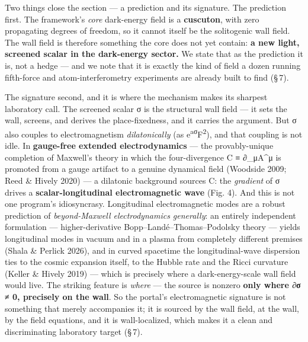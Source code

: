 \documentclass[11pt]{article}
\begin{document}
Two things close the section --- a prediction and its signature. The prediction first. The framework's \emph{core} dark-energy field is a \textbf{cuscuton}, with zero propagating degrees of freedom, so it cannot itself be the solitogenic wall field. The wall field is therefore something the core does not yet contain: \textbf{a new light, screened scalar in the dark-energy sector.} We state that as the prediction it is, not a hedge --- and we note that it is exactly the kind of field a dozen running fifth-force and atom-interferometry experiments are already built to find (\S\,7).

The signature second, and it is where the mechanism makes its sharpest laboratory call. The screened scalar σ is the structural wall field --- it sets the wall, screens, and derives the place-fixedness, and it carries the argument. But σ also couples to electromagnetism \emph{dilatonically} (as e\textsuperscript{aσ}F\textsuperscript{2}), and that coupling is not idle. In \textbf{gauge-free extended electrodynamics} --- the provably-unique completion of Maxwell's theory in which the four-divergence C ≡ ∂\_μA\textasciicircum{}μ is promoted from a gauge artifact to a genuine dynamical field (Woodside 2009; Reed \& Hively 2020) --- a dilatonic background sources C: the \emph{gradient} of σ drives a \textbf{scalar-longitudinal electromagnetic wave} (Fig. 4). And this is not one program's idiosyncrasy. Longitudinal electromagnetic modes are a robust prediction of \emph{beyond-Maxwell electrodynamics generally}: an entirely independent formulation --- higher-derivative Bopp--Landé--Thomas--Podolsky theory --- yields longitudinal modes in vacuum and in a plasma from completely different premises (Shala \& Perlick 2026), and in curved spacetime the longitudinal-wave dispersion ties to the cosmic expansion itself, to the Hubble rate and the Ricci curvature (Keller \& Hively 2019) --- which is precisely where a dark-energy-scale wall field would live. The striking feature is \emph{where} --- the source is nonzero \textbf{only where ∂σ ≠ 0, precisely on the wall}. So the portal's electromagnetic signature is not something that merely accompanies it; it is sourced by the wall field, at the wall, by the field equations, and it is wall-localized, which makes it a clean and discriminating laboratory target (\S\,7).
\end{document}
